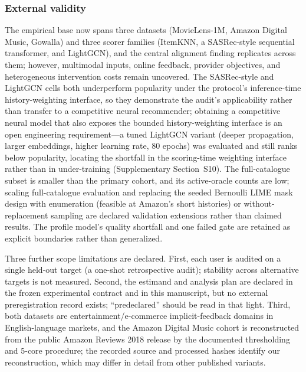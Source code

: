 \documentclass[a4paper,fleqn,doubleblind]{cas-sc}
\begin{document}
\subsubsection{External validity}
The empirical base now spans three datasets (MovieLens-1M, Amazon Digital Music, Gowalla) and three scorer families (ItemKNN, a SASRec-style sequential transformer, and LightGCN), and the central alignment finding replicates across them; however, multimodal inputs, online feedback, provider objectives, and heterogeneous intervention costs remain uncovered. The SASRec-style and LightGCN cells both underperform popularity under the protocol's inference-time history-weighting interface, so they demonstrate the audit's applicability rather than transfer to a competitive neural recommender; obtaining a competitive neural model that also exposes the bounded history-weighting interface is an open engineering requirement---a tuned LightGCN variant (deeper propagation, larger embeddings, higher learning rate, 80 epochs) was evaluated and still ranks below popularity, locating the shortfall in the scoring-time weighting interface rather than in under-training (Supplementary Section~S10). The full-catalogue subset is smaller than the primary cohort, and its active-oracle counts are low; scaling full-catalogue evaluation and replacing the seeded Bernoulli LIME mask design with enumeration (feasible at Amazon's short histories) or without-replacement sampling are declared validation extensions rather than claimed results. The profile model's quality shortfall and one failed gate are retained as explicit boundaries rather than generalized.

Three further scope limitations are declared. First, each user is audited on a single held-out target (a one-shot retrospective audit); stability across alternative targets is not measured. Second, the estimand and analysis plan are declared in the frozen experimental contract and in this manuscript, but no external preregistration record exists; ``predeclared'' should be read in that light. Third, both datasets are entertainment/e-commerce implicit-feedback domains in English-language markets, and the Amazon Digital Music cohort is reconstructed from the public Amazon Reviews 2018 release by the documented thresholding and 5-core procedure; the recorded source and processed hashes identify our reconstruction, which may differ in detail from other published variants.
\end{document}
